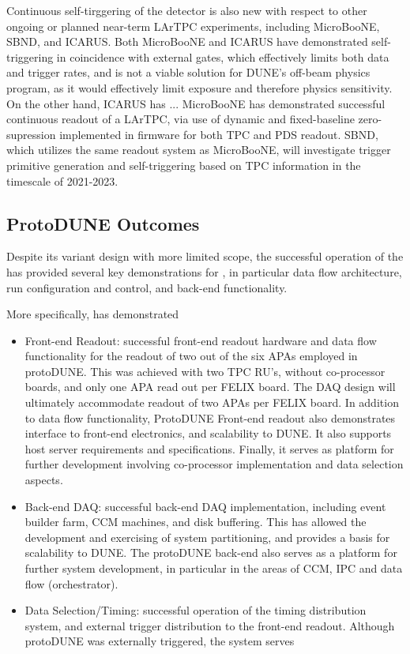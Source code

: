 Continuous self-tirggering of the detector is also new with respect to
other ongoing or planned near-term LArTPC experiments, including
MicroBooNE, SBND, and ICARUS. Both MicroBooNE and ICARUS have demonstrated
self-triggering in coincidence with external gates, which effectively
limits both data and trigger rates, and is not a viable solution for
DUNE's off-beam physics program, as it would effectively limit
exposure and therefore physics sensitivity. On the other hand, ICARUS
has ...
MicroBooNE has demonstrated successful continuous readout of a LArTPC,
via use of dynamic and fixed-baseline zero-supression implemented in
firmware for both TPC and PDS readout. SBND, which utilizes the same readout
system as MicroBooNE, will investigate trigger primitive generation
and self-triggering based on TPC information in the timescale of 2021-2023.


\subsection{ProtoDUNE Outcomes}

Despite its %
variant design %
with more limited scope, the %
successful operation of the   has provided several key
demonstrations for  , in particular data flow
architecture, run configuration and control, and back-end
functionality. %

More specifically,  has demonstrated 
\begin{itemize}
\item Front-end Readout: successful
front-end readout hardware and data flow functionality for the readout
of two out of the six APAs employed in protoDUNE. This was achieved
with two TPC RU's, without co-processor boards, and only one APA read
out per FELIX board. The  DAQ design will ultimately
accommodate readout of two APAs per FELIX board. In addition to data
flow functionality, ProtoDUNE Front-end readout also demonstrates interface to
front-end electronics, and scalability to DUNE. It also supports
host server requirements and specifications. Finally, it serves as
platform for further development involving co-processor implementation
and data selection aspects.
\item Back-end DAQ: successful back-end DAQ implementation, including event builder
  farm, CCM machines, and disk buffering. This has allowed the
  development and exercising of system partitioning, and provides a
  basis for scalability to DUNE. The protoDUNE back-end also serves as
  a platform for further system development, in particular in the
  areas of CCM, IPC and data flow (orchestrator).
\item Data Selection/Timing: successful operation of the timing
  distribution system, and external trigger distribution to the
  front-end readout. Although protoDUNE was externally triggered, the
  system serves
\end{itemize}

